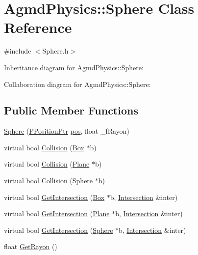 \hypertarget{class_agmd_physics_1_1_sphere}{\section{Agmd\+Physics\+:\+:Sphere Class Reference}
\label{class_agmd_physics_1_1_sphere}
}


{\ttfamily \#include $<$Sphere.\+h$>$}



Inheritance diagram for Agmd\+Physics\+:\+:Sphere\+:


Collaboration diagram for Agmd\+Physics\+:\+:Sphere\+:
\subsection*{Public Member Functions}
\begin{DoxyCompactItemize}
\item 
\hyperlink{class_agmd_physics_1_1_sphere_a347cc51fce4c9f225e8683e5083e13f2}{Sphere} (\hyperlink{namespace_agmd_physics_a72f849383bbb96be02fec5a53333d7fd}{P\+Position\+Ptr} \hyperlink{_examples_2_planet_2_app_8cpp_aa8a1c0491559faca4ebd0881575ae7f0}{pos}, float \+\_\+f\+Rayon)
\item 
virtual bool \hyperlink{class_agmd_physics_1_1_sphere_a98a64be50e9c009c075661332ed051f8}{Collision} (\hyperlink{class_agmd_physics_1_1_box}{Box} $\ast$b)
\item 
virtual bool \hyperlink{class_agmd_physics_1_1_sphere_a93f7c7e8340e4def8407f4627ee4b68e}{Collision} (\hyperlink{class_agmd_physics_1_1_plane}{Plane} $\ast$b)
\item 
virtual bool \hyperlink{class_agmd_physics_1_1_sphere_a92d86ba4f6c147e02ae63ff99cef5081}{Collision} (\hyperlink{class_agmd_physics_1_1_sphere}{Sphere} $\ast$b)
\item 
virtual bool \hyperlink{class_agmd_physics_1_1_sphere_aedf5fee3b53b08dd33bc1518c4f3577c}{Get\+Intersection} (\hyperlink{class_agmd_physics_1_1_box}{Box} $\ast$b, \hyperlink{struct_agmd_physics_1_1_intersection}{Intersection} \&inter)
\item 
virtual bool \hyperlink{class_agmd_physics_1_1_sphere_a7ac7e2daedc48515f3ce20db9287671f}{Get\+Intersection} (\hyperlink{class_agmd_physics_1_1_plane}{Plane} $\ast$b, \hyperlink{struct_agmd_physics_1_1_intersection}{Intersection} \&inter)
\item 
virtual bool \hyperlink{class_agmd_physics_1_1_sphere_a761e9597fbc0ff74180165a70dc3453f}{Get\+Intersection} (\hyperlink{class_agmd_physics_1_1_sphere}{Sphere} $\ast$b, \hyperlink{struct_agmd_physics_1_1_intersection}{Intersection} \&inter)
\item 
float \hyperlink{class_agmd_physics_1_1_sphere_ad7442773730d6d0074310dd3e9f8d876}{Get\+Rayon} ()
\end{DoxyCompactItemize}
